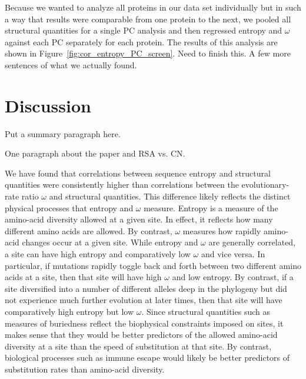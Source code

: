 \documentclass[12pt]{article}
\begin{document}
Because we wanted to analyze all proteins in our data set individually but in such a way that results were comparable from one protein to the next, we pooled all structural quantities for a single PC analysis and then regressed entropy and $\omega$ against each PC separately for each protein. The results of this analysis are shown in Figure~\ref{fig:cor_entropy_PC_screen}.
{\color{blue} Need to finish this. A few more sentences of what we actually found. }

\section*{Discussion}

{\color{blue}Put a summary paragraph here.}


{\color{blue}One paragraph about the \citep{Yehetal2014} paper and RSA vs. CN.}

We have found that correlations between sequence entropy and structural quantities were consistently higher than correlations between the evolutionary-rate ratio $\omega$ and structural quantities. This difference likely reflects the distinct physical processes that entropy and $\omega$ measure. Entropy is a measure of the amino-acid diversity allowed at a given site. In effect, it reflects how many different amino acids are allowed. By contrast, $\omega$ measures how rapidly amino-acid changes occur at a given site. While entropy and $\omega$ are generally correlated, a site can have high entropy and comparatively low $\omega$ and vice versa. In particular, if mutations rapidly toggle back and forth between two different amino acids at a site, then that site will have high $\omega$ and low entropy. By contrast, if a site diversified into a number of different alleles deep in the phylogeny but did not experience much further evolution at later times, then that site will have comparatively high entropy but low $\omega$. Since structural quantities such as measures of buriedness reflect the biophysical constraints imposed on sites, it makes sense that they would be better predictors of the allowed amino-acid diversity at a site than the speed of substitution at that site. By contrast, biological processes such as immune escape would likely be better predictors of substitution rates than amino-acid diversity.
\end{document}
